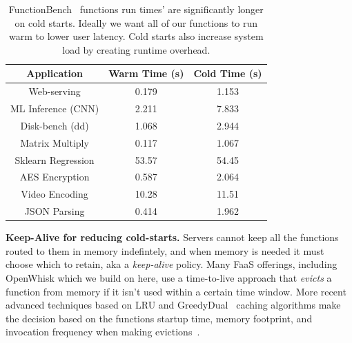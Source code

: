 \begin{table}
  \begin{tabular}{ c c c }
\hline
  Application & Warm Time (s) & Cold Time (s) \\ 
\hline
  Web-serving & 0.179 & 1.153 \\  
  ML Inference (CNN) & 2.211 & 7.833 \\
  Disk-bench (dd) & 1.068 & 2.944 \\  
  Matrix Multiply & 0.117 & 1.067 \\  
  Sklearn Regression & 53.57 & 54.45 \\  
  AES Encryption & 0.587 & 2.064 \\  
  Video Encoding & 10.28 & 11.51 \\  
  JSON Parsing & 0.414 & 1.962 \\
\hline
\end{tabular}
\caption{FunctionBench~\cite{kim_functionbench_2019} functions run times' are significantly longer on cold starts. Ideally we want all of our functions to run warm to lower user latency. Cold starts also increase system load by creating runtime overhead.}
\label{tab:func-times}
\vspace*{-0.4cm}
\end{table}



\noindent \textbf{Keep-Alive for reducing cold-starts.}
Servers cannot keep all the functions routed to them in memory indefintely, and when memory is needed it must choose which to retain, aka a \emph{keep-alive} policy.
Many FaaS offerings, including OpenWhisk which we build on here, use a time-to-live approach that \emph{evicts} a function from memory if it isn't used within a certain time window.
%
More recent advanced techniques based on LRU and GreedyDual~\cite{gdsf} caching algorithms make the decision based on the functions startup time, memory footprint, and invocation frequency when making evictions~\cite{faascache-asplos21}.

